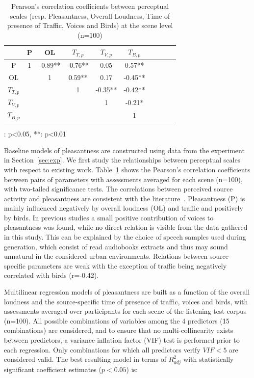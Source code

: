 \documentclass[twocolumn]{article}
\begin{document}
\begin{table}[t]
\centering
\begin{threeparttable}
\caption{Pearson's correlation coefficients between perceptual scales (resp. Pleasantness, Overall Loudness, Time of presence of Traffic, Voices and Birds) at the scene level (n=100)}
\label{tab:percc}
\begin{tabular}{ c | c c c c c c c c c }
\hline
	 & P & OL & $T_{T, p}$ & $T_{V, p}$ & $T_{B, p}$ \\ \hline
	P & 1 & -0.89** & -0.76** & 0.05 & 0.57** \\
	OL &  & 1 & 0.59** & 0.17 & -0.45** \\
	$T_{T, p}$ &  &  & 1 & -0.35** & -0.42** \\
	$T_{V, p}$ &  &  &  & 1 & -0.21* \\
	$T_{B, p}$ &  &  &  &  & 1 \\ \hline
\end{tabular}
\begin{tablenotes}
\item *: p<0.05, **: p<0.01
\end{tablenotes}
\end{threeparttable}
\end{table}

Baseline models of pleasantness are constructed using data from the experiment in Section~\ref{sec:exp}. We first study the relationships between perceptual scales with respect to existing work. Table~\ref{tab:percc} shows the Pearson's correlation coefficients between pairs of parameters with assessments averaged for each scene (n=100), with two-tailed significance tests. The correlations between perceived source activity and pleasantness are consistent with the literature~\cite{aumond2017, gontier2018}. Pleasantness (P) is mainly influenced negatively by overall loudness (OL) and traffic and positively by birds. In previous studies a small positive contribution of voices to pleasantness was found, while no direct relation is visible from the data gathered in this study. This can be explained by the choice of speech samples used during generation, which consist of read audiobooks extracts and thus may sound unnatural in the considered urban environments. Relations between source-specific parameters are weak with the exception of traffic being negatively correlated with birds (r=-0.42).

Multilinear regression models of pleasantness are built as a function of the overall loudness and the source-specific time of presence of traffic, voices and birds, with assessments averaged over participants for each scene of the listening test corpus (n=100). All possible combinations of variables among the 4 predictors (15 combinations) are considered, and to ensure that no multi-collinearity exists between predictors, a variance inflation factor (VIF) test is performed prior to each regression. Only combinations for which all predictors verify $VIF<5$ are considered valid. The best resulting model in terms of $R^2_{adj}$ with statistically significant coefficient estimates ($p<0.05$) is:
\end{document}
